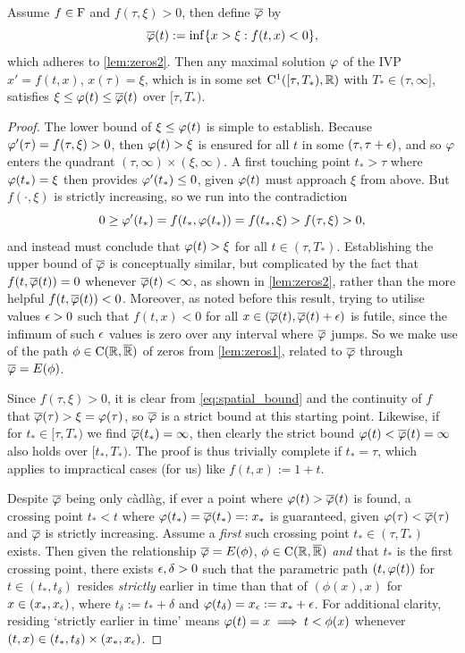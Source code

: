 \begin{lemma}\label{lem:spatial_bounds}
    Assume $f\in\mathrm{F}$ and $f(\tau,\xi)>0$, then define $\overline{\varphi}$ by
    \begin{equation}\label{eq:spatial_bound}
        \overline{\varphi}(t) := \inf\{x>\xi:f(t,x)<0\},
    \end{equation}
   which adheres to \autoref{lem:zeros2}. Then any maximal solution $\varphi$ of the IVP $x'=f(t,x)$, $x(\tau)=\xi$, which is in some set $\mathrm{C}^1([\tau,T_*),\mathbb{R})$ with $T_*\in(\tau,\infty]$, satisfies $\xi\le\varphi(t)\le\overline{\varphi}(t)$ over $[\tau,T_*)$.
\end{lemma}
\begin{proof}
    The lower bound of $\xi\le\varphi(t)$ is simple to establish. Because $\varphi'(\tau) = f(\tau,\xi) > 0$, then $\varphi(t)>\xi$ is ensured for all $t$ in some $(\tau,\tau+\epsilon)$, and so $\varphi$ enters the quadrant $(\tau,\infty)\times(\xi,\infty)$. A first touching point $t_*>\tau$ where $\varphi(t_*)=\xi$ then provides $\varphi'(t_*)\le0$, given $\varphi(t)$ must approach $\xi$ from above. But $f(\cdot,\xi)$ is strictly increasing, so we run into the contradiction
    \begin{equation}
        0 \ge \varphi'(t_*) = f(t_*,\varphi(t_*)) = f(t_*,\xi) > f(\tau,\xi) >0,
    \end{equation}
    and instead must conclude that $\varphi(t)>\xi$ for all $t\in(\tau,T_*)$. Establishing the upper bound of $\overline{\varphi}$ is conceptually similar, but complicated by the fact that $f(t,\overline{\varphi}(t))=0$ whenever $\overline{\varphi}(t)<\infty$, as shown in \autoref{lem:zeros2}, rather than the more helpful $f(t,\overline{\varphi}(t))<0$. Moreover, as noted before this result, trying to utilise values $\epsilon>0$ such that $f(t,x)<0$ for all $x\in(\overline{\varphi}(t),\overline{\varphi}(t)+\epsilon)$ is futile, since the infimum of such $\epsilon$ values is zero over any interval where $\overline{\varphi}$ jumps. So we make use of the path $\phi\in\mathrm{C}(\mathbb{R},{\overline{\mathbb{R}}})$ of zeros from \autoref{lem:zeros1}, related to $\overline{\varphi}$ through $\overline{\varphi}=E(\phi)$.

    Since $f(\tau,\xi)>0$, it is clear from \autoref{eq:spatial_bound} and the continuity of $f$ that $\overline{\varphi}(\tau)>\xi=\varphi(\tau)$, so $\overline{\varphi}$ is a strict bound at this starting point. Likewise, if for $t_*\in[\tau,T_*)$ we find $\overline{\varphi}(t_*)=\infty$, then clearly the strict bound $\varphi(t)<\overline{\varphi}(t)=\infty$ also holds over $[t_*,T_*)$. The proof is thus trivially complete if $t_*=\tau$, which applies to impractical cases (for us) like $f(t,x):=1 + t$.

    Despite $\overline{\varphi}$ being only c\`adl\`ag, if ever a point where $\varphi(t)>\overline{\varphi}(t)$ is found, a crossing point $t_*<t$ where $\varphi(t_*)=\overline{\varphi}(t_*)=:x_*$ is guaranteed, given $\varphi(\tau)<\overline{\varphi}(\tau)$ and $\overline{\varphi}$ is strictly increasing. Assume a \emph{first} such crossing point $t_*\in(\tau,T_*)$ exists. Then given the relationship $\overline{\varphi}=E(\phi)$, $\phi\in\mathrm{C}(\mathbb{R},{\overline{\mathbb{R}}})$ \emph{and} that $t_*$ is the first crossing point, there exists $\epsilon,\delta>0$ such that the parametric path $(t,\varphi(t))$ for $t\in(t_*,t_\delta)$ resides \emph{strictly} earlier in time than that of $(\phi(x),x)$ for $x\in(x_*,x_\epsilon)$, where $t_\delta:=t_*+\delta$ and $\varphi(t_\delta)=x_\epsilon:=x_*+\epsilon$. For additional clarity, residing `strictly earlier in time' means $\varphi(t)=x\implies t<\phi(x)$ whenever $(t,x)\in(t_*,t_\delta)\times(x_*,x_\epsilon)$.


\end{proof}
